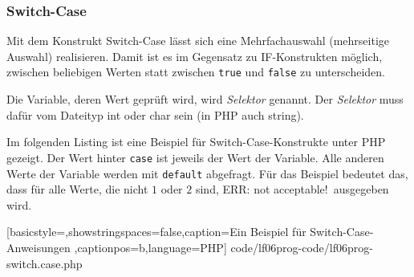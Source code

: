 \subsubsection{Switch-Case}

Mit dem Konstrukt Switch-Case lässt sich eine Mehrfachauswahl (mehrseitige Auswahl) realisieren. Damit ist es im Gegensatz zu IF-Konstrukten möglich, zwischen beliebigen Werten statt zwischen \texttt{true} und \texttt{false} zu unterscheiden.

Die Variable, deren Wert geprüft wird, wird {\it Selektor} genannt. Der {\it Selektor} muss dafür vom Dateityp int oder char sein (in PHP auch string).

Im folgenden Listing ist eine Beispiel für Switch-Case-Konstrukte unter PHP gezeigt. Der Wert hinter \texttt{case} ist jeweils der Wert der Variable. Alle anderen Werte der Variable werden mit \texttt{default} abgefragt. Für das Beispiel bedeutet das, dass für alle Werte, die nicht $1$ oder $2$ sind, \ql ERR: not acceptable!\qr\ ausgegeben wird.


	[basicstyle=\small,showstringspaces=false,caption={Ein Beispiel für Switch-Case-Anweisungen}
	\label{lst:Switch-Case},captionpos=b,language=PHP]
	{code/lf06prog-code/lf06prog-switch.case.php}
	
